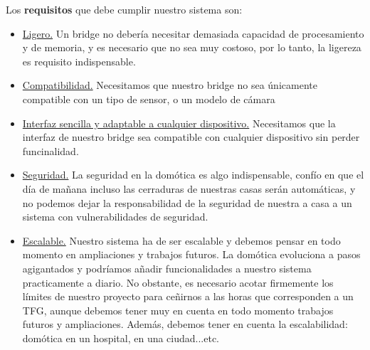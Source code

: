 Los \textbf{requisitos} que debe cumplir nuestro sistema son:
\begin{itemize}
  \item \underline{Ligero.} Un bridge no debería necesitar demasiada capacidad de procesamiento y de memoria, y es necesario que no sea muy costoso, por lo tanto, la ligereza es requisito indispensable.
  \item \underline{Compatibilidad.} Necesitamos que nuestro bridge no sea únicamente compatible con un tipo de sensor, o un modelo de cámara
  \item \underline{Interfaz sencilla y adaptable a cualquier dispositivo.} Necesitamos que la interfaz de nuestro bridge sea compatible con cualquier dispositivo sin perder funcinalidad.
  \item \underline{Seguridad.} La seguridad en la domótica es algo indispensable, confío en que el día de mañana incluso las cerraduras de nuestras casas serán automáticas, y no podemos dejar la responsabilidad de la seguridad
  de nuestra a casa a un sistema con vulnerabilidades de seguridad.
  \item \underline{Escalable.} Nuestro sistema ha de ser escalable y debemos pensar en todo momento en ampliaciones y trabajos futuros. La domótica evoluciona a pasos agigantados y podríamos añadir funcionalidades a nuestro 
  sistema practicamente a diario. No obstante, es necesario acotar firmemente los límites de nuestro proyecto para ceñirnos a las horas que corresponden a un TFG, aunque debemos tener muy en cuenta en todo momento trabajos futuros y ampliaciones.
  Además, debemos tener en cuenta la escalabilidad: domótica en un hospital, en una ciudad...etc.
\end{itemize}


\newpage \thispagestyle{empty} %